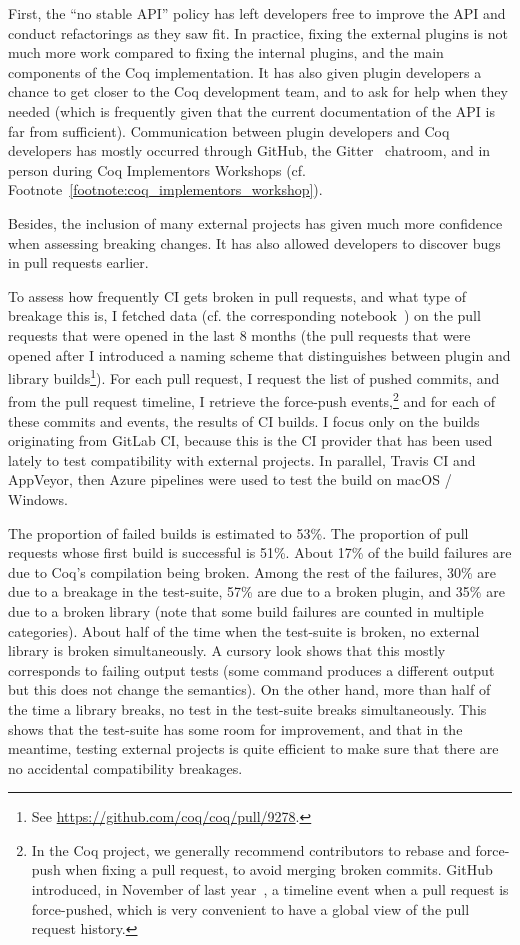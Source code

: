 First, the ``no stable API'' policy has left developers free to improve the API and conduct refactorings as they saw fit.
In practice, fixing the external plugins is not much more work compared to fixing the internal plugins, and the main components of the Coq implementation.
It has also given plugin developers a chance to get closer to the Coq development team, and to ask for help when they needed (which is frequently given that the current documentation of the API is far from sufficient).
Communication between plugin developers and Coq developers has mostly occurred through GitHub, the Gitter~\cite{gitter} chatroom, and in person during Coq Implementors Workshops (cf. Footnote~\ref{footnote:coq_implementors_workshop}).

Besides, the inclusion of many external projects has given much more confidence when assessing breaking changes. It has also allowed developers to discover bugs in  pull requests earlier.

To assess how frequently CI gets broken in pull requests, and what type of breakage this is, I fetched data (cf. the corresponding notebook~\cite{zimmermann2019ci}) on the pull requests that were opened in the last 8 months (the pull requests that were opened after I introduced a naming scheme that distinguishes between plugin and library builds\footnote{See \url{https://github.com/coq/coq/pull/9278}.}).
For each pull request, I request the list of pushed commits, and from the pull request timeline, I retrieve the force-push events,\footnote{
	In the Coq project, we generally recommend contributors to rebase and force-push when fixing a pull request, to avoid merging broken commits.
	GitHub introduced, in November of last year~\cite{github_force_push}, a timeline event when a pull request is force-pushed, which is very convenient to have a global view of the pull request history.
} and for each of these commits and events, the results of CI builds.
I focus only on the builds originating from GitLab CI, because this is the CI provider that has been used lately to test compatibility with external projects. In parallel, Travis CI and AppVeyor, then Azure pipelines were used to test the build on macOS / Windows.

The proportion of failed builds is estimated to 53\%.
The proportion of pull requests whose first build is successful is 51\%.
About 17\% of the build failures are due to Coq's compilation being broken.
Among the rest of the failures, 30\% are due to a breakage in the test-suite, 57\% are due to a broken plugin, and 35\% are due to a broken library (note that some build failures are counted in multiple categories).
About half of the time when the test-suite is broken, no external library is broken simultaneously.
A cursory look shows that this mostly corresponds to failing output tests (some command produces a different output but this does not change the semantics).
On the other hand, more than half of the time a library breaks, no test in the test-suite breaks simultaneously.
This shows that the test-suite has some room for improvement, and that in the meantime, testing external projects is quite efficient to make sure that there are no accidental compatibility breakages.

